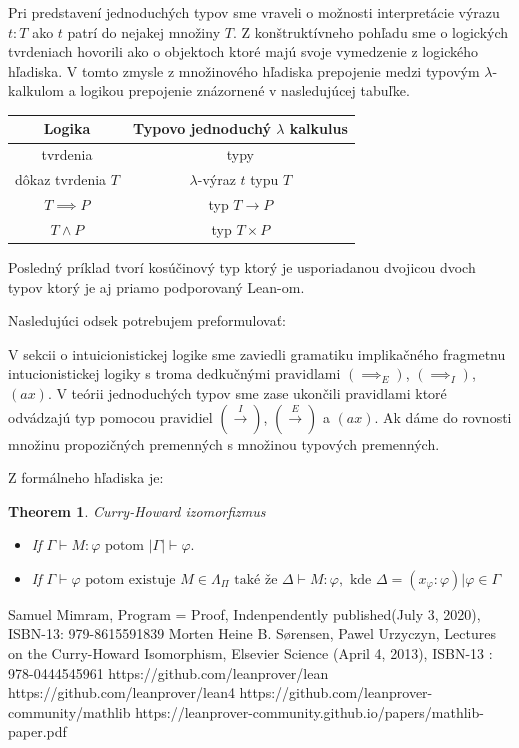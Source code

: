 \documentclass[a4paper,10pt,oneside]{report}%
\newtheorem{theorem}{Theorem}
\begin{document}
    Pri predstavení jednoduchých typov sme vraveli o možnosti interpretácie výrazu
$t : T$ ako $t$ patrí do nejakej množiny $T$.
    Z konštruktívneho pohľadu sme o logických tvrdeniach hovorili ako o objektoch
ktoré majú svoje vymedzenie z logického hľadiska.
    V tomto zmysle z množinového hľadiska prepojenie medzi typovým $\lambda$-kalkulom
a logikou prepojenie znázornené v nasledujúcej tabuľke.
\begin{center}
    \begin{tabular}{ c c }
        Logika &                Typovo jednoduchý $\lambda$ kalkulus \\
        \hline
        tvrdenia                & typy \\
        dôkaz tvrdenia $T$      & $\lambda$-výraz $t$ typu $T$ \\
        $T \implies P$          & typ $T \to P$ \\
        $T \wedge P$            & typ $T \times P$
    \end{tabular}
\end{center}
    Posledný príklad tvorí kosúčinový typ ktorý je usporiadanou dvojicou dvoch typov
ktorý je aj priamo podporovaný Lean-om.

Nasledujúci odsek potrebujem preformulovať:

    V sekcii o intuicionistickej logike sme zaviedli gramatiku implikačného fragmetnu
intucionistickej logiky s troma dedkučnými pravidlami $(\implies_{E})$,
    $(\implies_{I})$, $(ax)$.
    V teórii jednoduchých typov sme zase ukončili pravidlami ktoré odvádzajú
typ pomocou pravidiel $(\overset{I}{\rightarrow})$, $(\overset{E}{\rightarrow})$ a $(ax)$.
    Ak dáme do rovnosti množinu propozičných premenných s množinou typových premenných.

    Z formálneho hľadiska je:
\begin{theorem}{Curry-Howard izomorfizmus}
    \begin{itemize}
        \item If $\Gamma \vdash M : \varphi \textrm{ potom } |\Gamma|  \vdash \varphi.$
        \item If $\Gamma \vdash \varphi \textrm{ potom existuje } M \in \Lambda_{\Pi}
            \textrm{ také že } \Delta \vdash M : \varphi, \textrm{ kde }
            \Delta = { ( x_{\varphi} : \varphi ) | \varphi \in \Gamma }$
    \end{itemize}
\end{theorem}

\begin{thebibliography}{xx}
     Samuel Mimram, Program = Proof, Indenpendently published(July 3, 2020), ISBN-13: 979-8615591839
     Morten Heine B. Sørensen, Pawel Urzyczyn, Lectures on the Curry-Howard Isomorphism,
        Elsevier Science (April 4, 2013),  ISBN-13 : 978-0444545961
     https://github.com/leanprover/lean
     https://github.com/leanprover/lean4
     https://github.com/leanprover-community/mathlib
     https://leanprover-community.github.io/papers/mathlib-paper.pdf
\end{thebibliography}
\end{document}
